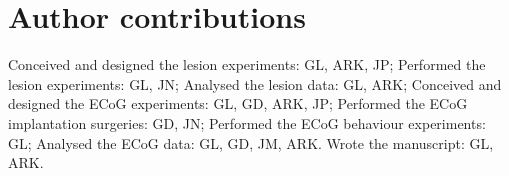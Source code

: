
\section{Author contributions}

Conceived and designed the lesion experiments: GL, ARK, JP; Performed the lesion experiments: GL, JN; Analysed the lesion data: GL, ARK; Conceived and designed the ECoG experiments: GL, GD, ARK, JP; Performed the ECoG implantation surgeries: GD, JN; Performed the ECoG behaviour experiments: GL; Analysed the ECoG data: GL, GD, JM, ARK. Wrote the manuscript: GL, ARK.
